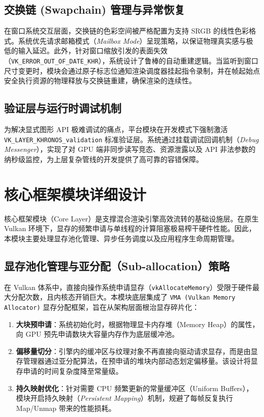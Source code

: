 \subsection{交换链 (Swapchain) 管理与异常恢复}
在窗口系统交互层面，交换链的色彩空间被严格配置为支持 SRGB 的线性色彩格式。系统优先请求邮箱模式（\textit{Mailbox Mode}）呈现策略，以保证物理真实感与极低的输入延迟。此外，针对窗口缩放引发的表面失效（\texttt{VK\_ERROR\_OUT\_OF\_DATE\_KHR}），系统设计了鲁棒的自动重建逻辑。当监听到窗口尺寸变更时，模块会通过原子标志位通知渲染调度器挂起指令录制，并在帧起始点安全执行资源的物理释放与交换链重建，确保渲染的连续性。

\subsection{验证层与运行时调试机制}
为解决显式图形 API 极难调试的痛点，平台模块在开发模式下强制激活 \texttt{VK\_LAYER\_KHRONOS\_validation} 标准验证层。系统通过挂载调试回调机制（\textit{Debug Messenger}），实现了对 GPU 端非同步读写竞态、资源泄露以及 API 非法参数的纳秒级监控，为上层复杂管线的开发提供了高可靠的容错保障。

\section{核心框架模块详细设计}
核心框架模块（Core Layer）是支撑混合渲染引擎高效流转的基础设施层。在原生 Vulkan 环境下，显存的频繁申请与单线程的计算阻塞极易榨干硬件性能。因此，本模块主要处理显存池化管理、异步任务调度以及应用程序生命周期管理。

\subsection{显存池化管理与亚分配（Sub-allocation）策略}
在 Vulkan 体系中，直接向操作系统申请显存（\texttt{vkAllocateMemory}）受限于硬件最大分配次数，且内核态开销巨大。本模块底层集成了 \texttt{VMA (Vulkan Memory Allocator)} 显存分配框架，旨在从架构层面根治显存碎片化：
\begin{enumerate}
    \item \textbf{大块预申请}：系统初始化时，根据物理显卡内存堆（Memory Heap）的属性，向 GPU 预先申请数块大容量内存作为底层缓冲池。
    \item \textbf{偏移量切分}：引擎内的缓冲区与纹理对象不再直接向驱动请求显存，而是由显存管理器通过亚分配算法，在预申请的堆块内部动态划定偏移量。该设计将显存申请的时间复杂度降至常量级。
    \item \textbf{持久映射优化}：针对需要 CPU 频繁更新的常量缓冲区（Uniform Buffers），模块开启持久映射（\textit{Persistent Mapping}）机制，规避了每帧反复执行 Map/Unmap 带来的性能损耗。
\end{enumerate}

